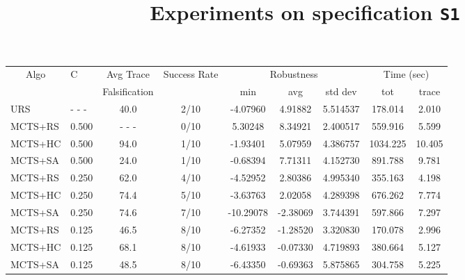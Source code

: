 \documentclass[11pt]{article}
\begin{document}
\begin{table}[ht]
\centering
\title{Experiments on specification \texttt{S1}}
\begin{tabular}{|l|l|c|c|c|c|c|c|c|}
\hline
\multicolumn{1}{|c|}{\multirow{2}{*}{Algo}} & \multirow{2}{*}{C} & Avg Trace               & \multirow{2}{*}{Success Rate} & \multicolumn{3}{c|}{Robustness} & \multicolumn{2}{c|}{Time (sec)} \\ \cline{5-9} 
\multicolumn{1}{|c|}{}                      &                    & Falsification           &                               & min       & avg      & std dev  & tot        & trace        \\ \hline
URS                                         & - - -              &  40.0                   & 2/10                          & -4.07960  & 4.91882  & 5.514537 &  178.014 &  2.010    \\ \hline
MCTS+RS                                     & 0.500              & - - -                   & 0/10                          &  5.30248  & 8.34921  & 2.400517 &  559.916 &  5.599    \\
MCTS+HC                                     & 0.500              &  94.0                   & 1/10                          & -1.93401  & 5.07959  & 4.386757 & 1034.225 & 10.405    \\
MCTS+SA                                     & 0.500              &  24.0                   & 1/10                          & -0.68394  & 7.71311  & 4.152730 &  891.788 &  9.781    \\ \hline

MCTS+RS                                     & 0.250              &  62.0                   & 4/10                          & -4.52952  &  2.80386 & 4.995340 &  355.163 &  4.198    \\
MCTS+HC                                     & 0.250              &  74.4                   & 5/10                          & -3.63763  &  2.02058 & 4.289398 &  676.262 &  7.774    \\
MCTS+SA                                     & 0.250              &  74.6                   & 7/10                          & -10.29078 & -2.38069 & 3.744391 &  597.866 &  7.297    \\ \hline

MCTS+RS                                     & 0.125              &  46.5                   & 8/10                          & -6.27352  & -1.28520 & 3.320830 &  170.078 &  2.996    \\
MCTS+HC                                     & 0.125              &  68.1                   & 8/10                          & -4.61933  & -0.07330 & 4.719893 &  380.664 &  5.127    \\
MCTS+SA                                     & 0.125              &  48.5                   & 8/10                          & -6.43350  & -0.69363 & 5.875865 &  304.758 &  5.225    \\ \hline


\end{tabular}
\end{table}
\end{document}
